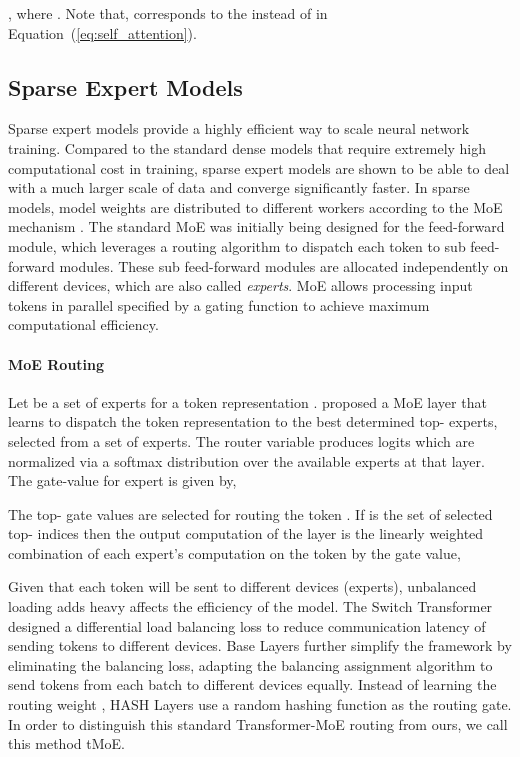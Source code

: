 \documentclass{article}
\begin{document}
, where . Note that,  corresponds to the  instead of  in Equation~(\ref{eq:self_attention}). 




\subsection{Sparse Expert Models}
\label{sec:backgroud_moe}



Sparse expert models provide a highly efficient way to scale neural network training. Compared to the standard dense models that require extremely high computational cost in training, sparse expert models are shown to be able to deal with a much larger scale of data and converge significantly faster. In sparse models, model weights are distributed to different workers according to the MoE mechanism \citep{gshard,switch,baselayer,hashlayer,alibaba}.
The standard MoE was initially being designed for the feed-forward module, which leverages a routing algorithm to dispatch each token to  sub feed-forward modules. These sub feed-forward modules are allocated independently on different devices, which are also called {\em experts}. MoE allows processing input tokens in parallel specified by a gating function to achieve maximum computational efficiency. 

\paragraph{MoE Routing}
Let  be a set of  experts for a token representation . 
\citet{shazeer2017outrageously} proposed a MoE layer that learns to dispatch the token representation to the best determined top- experts, selected from a set  of  experts.
The router variable  produces logits  which are normalized via a softmax distribution over the available  experts at that layer. The gate-value for expert  is given by,

The top- gate values are selected for routing the token .
If  is the set of selected top- indices then the output computation of the layer is the linearly weighted combination of each expert's computation on the token by the gate value,

Given that each token will be sent to different devices (experts), unbalanced loading adds heavy affects the efficiency of the model. The Switch Transformer \citep{switch} designed a differential load balancing loss to reduce communication latency of sending tokens to different devices.  
Base Layers \citep{baselayer} further simplify the framework by eliminating the balancing loss, adapting the balancing assignment algorithm \citep{bertsekas1992auction} to send tokens from each batch to different devices equally. Instead of learning the routing weight , HASH Layers \citep{hashlayer} use a random hashing function as the routing gate. In order to distinguish this standard Transformer-MoE routing \citep{gshard,switch,baselayer,hashlayer,alibaba} from ours, we call this method tMoE. 
\end{document}
